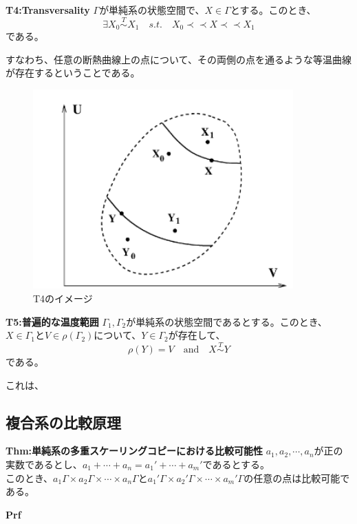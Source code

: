 \documentclass[a4paper,11pt]{jsarticle}
\numberwithin{equation}{section}
\begin{document}
\begin{itembox}[l]{\textbf{T4:Transversality}}
    $\Gamma$が単純系の状態空間で、$X \in \Gamma$とする。このとき、
    \begin{equation}
    \exists X_0 \overset{T}{\sim} X_1 \quad s.t.\quad  X_0 \prec \prec X \prec \prec X_1
    \end{equation}
    である。
\end{itembox}
すなわち、任意の断熱曲線上の点について、その両側の点を通るような等温曲線が存在するということである。\\
\begin{figure}[H]
    \begin{center}
    \includegraphics[width=100mm]{fig6a.png}
    \end{center}
    \caption{T4のイメージ}
    \label{fig:four}
\end{figure}

\begin{itembox}[l]{\textbf{T5:普遍的な温度範囲}}
    $\Gamma_1,\Gamma_2$が単純系の状態空間であるとする。このとき、$X \in \Gamma_1$と$V \in \rho (\Gamma_2)$について、$Y \in \Gamma_2$が存在して、
    \begin{equation}
        \rho(Y) =V \quad \text{and} \quad X \overset{T}{\sim} Y
    \end{equation}
    である。
\end{itembox}
これは、

\subsection{複合系の比較原理}
\begin{itembox}[l]{\textbf{Thm:単純系の多重スケーリングコピーにおける比較可能性}}
    $a_1,a_2,\cdots,a_n$が正の実数であるとし、$a_1+\cdots +a_n=a_1'+\cdots+a_m'$であるとする。\\
    このとき、$a_1 \Gamma \times a_2 \Gamma \times \cdots \times a_n \Gamma$と$a_1' \Gamma \times a_2' \Gamma \times \cdots \times a_m' \Gamma$の任意の点は比較可能である。
\end{itembox}
\textbf{Prf}\\
\hfill\qedsymbol\\
\end{document}
